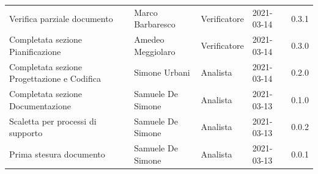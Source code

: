 \documentclass[a4paper]{article}
\begin{document}
\begin{center}
\begin{table}[h!]
\begin{tabular}{p{160px} p{90px} p{65px} p{60px} p{45px}}
            Verifica parziale documento                 & Marco Barbaresco                            & Verificatore   & 2021-03-14    & 0.3.1             \\
            Completata sezione Pianificazione           & Amedeo Meggiolaro                           & Verificatore   & 2021-03-14    & 0.3.0             \\
            Completata sezione Progettazione e Codifica & Simone Urbani                               & Analista       & 2021-03-14    & 0.2.0             \\
            Completata sezione Documentazione           & Samuele De Simone                           & Analista       & 2021-03-13    & 0.1.0             \\
            Scaletta per processi di supporto           & Samuele De Simone                           & Analista       & 2021-03-13    & 0.0.2             \\
            Prima stesura documento                     & Samuele De Simone                           & Analista       & 2021-03-13    & 0.0.1             \\
        \end{tabular}
    \end{table}
\end{center}
\newpage
\tableofcontents
\newpage




\end{document}
